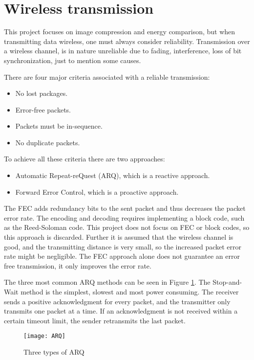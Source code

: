 \section{Wireless transmission}\label{sec:wireless}
This project focuses on image compression and energy comparison, but when transmitting data wireless, one must always consider reliability.
Transmission over a wireless channel, is in nature unreliable due to fading, interference, loss of bit synchronization, just to mention some causes.

There are four major criteria associated with a reliable transmission:
\begin{itemize}
\item No lost packages.
\item Error-free packets.
\item Packets must be in-sequence.
\item No duplicate packets.
\end{itemize}
To achieve all these criteria there are two approaches:
\begin{itemize}
\item Automatic Repeat-reQuest (ARQ), which is a reactive approach.
\item Forward Error Control, which is a proactive approach. 
\end{itemize}

The FEC adds redundancy bits to the sent packet and thus decreases the packet error rate.
The encoding and decoding requires implementing a block code, such as the Reed-Soloman code.
This project does not focus on FEC or block codes, so this approach is discarded.
Further it is assumed that the wireless channel is good, and the transmitting distance is very small, so the increased packet error rate might be negligible.
The FEC approach alone does not guarantee an error free transmission, it only improves the error rate.

The three most common ARQ methods can be seen in Figure \ref{fig:ARQ}. The Stop-and-Wait method is the simplest, slowest and most power consuming. The receiver sends a positive acknowledgment for every packet, and the transmitter only transmits one packet at a time. If an acknowledgment is not received within a certain timeout limit, the sender retransmits the last packet.

\begin{figure}
\centering
\texttt{[image: ARQ]}
\caption{Three types of ARQ}
\label{fig:ARQ}
\end{figure}

